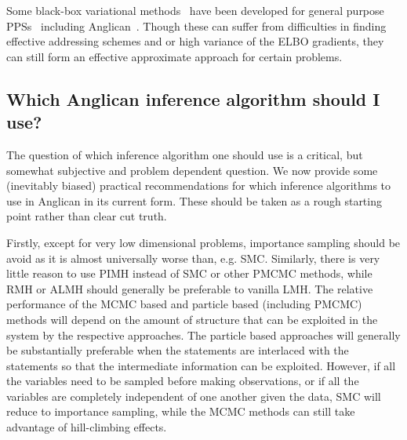 Some black-box variational methods~\citep{ranganath_aistats_2014} 
	have been developed for general purpose PPSs~\citep{kucukelbir2015automatic} including Anglican~\citep{vandemeent2016black,paige2017thesis}.  Though these can suffer from difficulties
	in finding effective addressing schemes and or high variance of the ELBO gradients, they can still
	form an effective approximate approach for certain problems.

\subsection{Which Anglican inference algorithm should I use?}
\label{sec:proginf:str:which}

The question of which inference algorithm one should use is a critical, but somewhat subjective and
problem dependent question.  We now provide some (inevitably biased) practical recommendations for which
inference algorithms to use in Anglican in its current form.  These
should be taken as a rough starting point rather than clear cut truth.

Firstly, except for very low dimensional problems, importance sampling should
be avoid as it is almost universally worse than, e.g. SMC.  Similarly, there is very little reason to use PIMH
instead of SMC or other PMCMC methods, while RMH or ALMH should generally be preferable to vanilla LMH.
The relative performance of the MCMC
based and particle based (including PMCMC) methods will depend on the amount of structure that can
be exploited in the system by the respective approaches.  The particle based approaches will generally be substantially
preferable when the \observe statements are interlaced with the \sample statements so that the intermediate
information can be exploited.  However, if all the variables need to be sampled before making observations, or if
all the variables are completely independent of one another given the data, SMC will reduce to importance sampling,
while the MCMC methods can still take advantage of hill-climbing effects.

